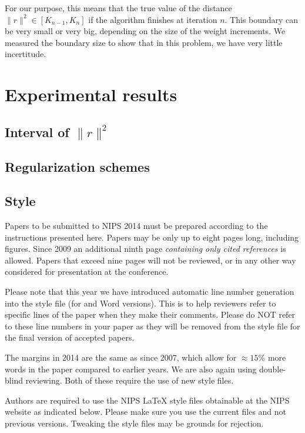 \documentclass{article} %
\begin{document}
For our purpose, this means that the true value of the distance
$\lVert{r} \rVert^2 \in [K_{n-1}, K_n]$ if the algorithm finishes at iteration
$n$. This boundary can be very small or very big, depending on the size of the
weight increments. We measured the boundary size to show that in this problem,
we have very little incertitude.



\section{Experimental results}

\subsection{Interval of $\lVert{r} \rVert^2$}


\subsection{Regularization schemes}

\subsection{Style}

Papers to be submitted to NIPS 2014 must be prepared according to the
instructions presented here. Papers may be only up to eight pages long,
including figures. Since 2009 an additional ninth page \textit{containing only
cited references} is allowed. Papers that exceed nine pages will not be
reviewed, or in any other way considered for presentation at the conference.

Please note that this year we have introduced automatic line number generation
into the style file (for \LaTeXe and Word versions). This is to help reviewers
refer to specific lines of the paper when they make their comments. Please do
NOT refer to these line numbers in your paper as they will be removed from the
style file for the final version of accepted papers.

The margins in 2014 are the same as since 2007, which allow for $\approx 15\%$
more words in the paper compared to earlier years. We are also again using 
double-blind reviewing. Both of these require the use of new style files.

Authors are required to use the NIPS \LaTeX{} style files obtainable at the
NIPS website as indicated below. Please make sure you use the current files and
not previous versions. Tweaking the style files may be grounds for rejection.
\end{document}
